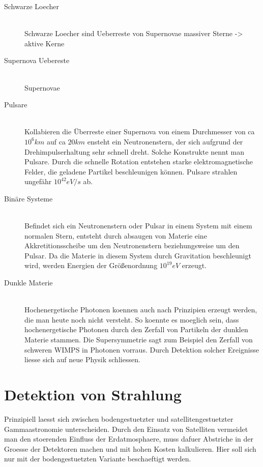 \begin{description}
\item[Schwarze Loecher]\hfill \\
Schwarze Loecher sind Ueberreste von Supernovae massiver Sterne -> aktive Kerne
\item[Supernova Uebereste]\hfill \\
Supernovae
\item[Pulsare]\hfill \\
Kollabieren die Überreste einer Supernova von einem Durchmesser von ca $10^6km$ auf ca $20km$ ensteht ein Neutronenstern, der sich aufgrund der Drehimpulserhaltung sehr schnell dreht. Solche Konstrukte nennt man Pulsare. Durch die schnelle Rotation entstehen starke elektromagnetische Felder, die geladene Partikel beschleunigen können. Pulsare strahlen ungefähr $10^42eV/s$ ab.
\item[Binäre Systeme]\hfill \\ 
Befindet sich ein Neutronenstern oder Pulsar in einem System mit einem normalen Stern, entsteht durch absaugen von Materie eine Akkretitionsscheibe um den Neutronenstern beziehungsweise um den Pulsar. Da die Materie in diesem System durch Gravitation beschleunigt wird, werden Energien der Größenordnung $10^19 eV$ erzeugt. 
\item[Dunkle Materie]\hfill \\
Hochenergetische Photonen koennen auch nach Prinzipien erzeugt werden, die man heute noch nicht versteht. So koennte es moeglich sein, dass hochenergetische Photonen durch den Zerfall von Partikeln der dunklen Materie stammen. Die Supersymmetrie sagt zum Beispiel den Zerfall von schweren WIMPS in Photonen vorraus. Durch Detektion solcher Ereignisse liesse sich auf neue Physik schliessen.
\end{description}


\section{Detektion von Strahlung}
Prinzipiell laesst sich zwischen bodengestuetzter und satellitengestuetzter Gammaastronomie unterscheiden. Durch den Einsatz von Satelliten vermeidet man den stoerenden Einfluss der Erdatmosphaere, muss dafuer Abstriche in der Groesse der Detektoren machen und mit hohen Kosten kalkulieren. Hier soll sich nur mit der bodengestuetzten Variante beschaeftigt werden.

